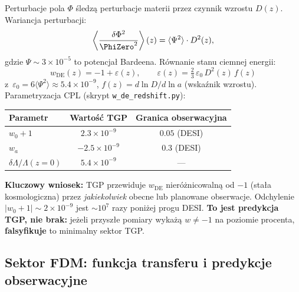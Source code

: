 \begin{remark}\label{rem:wz-quantitative}
Perturbacje pola $\Phi$ \'sledz\k{a} perturbacje materii
przez czynnik wzrostu $D(z)$. Wariancja perturbacji:
\begin{equation}\label{eq:delta-Phi-var}
  \left\langle\frac{\delta\Phi^2}{\PhiZero^2}\right\rangle(z)
  = \langle\Psi^2\rangle \cdot D^2(z),
\end{equation}
gdzie $\Psi \sim 3\times 10^{-5}$ to potencja\l{} Bardeena.
R\'ownanie stanu ciemnej energii:
\begin{equation}\label{eq:w-de-tgp}
  \boxed{
    w_{\mathrm{DE}}(z) = -1 + \varepsilon(z), \qquad
    \varepsilon(z) = \tfrac{2}{3}\,\varepsilon_0\,D^2(z)\,f(z)
  }
\end{equation}
z~$\varepsilon_0 = 6\langle\Psi^2\rangle \approx 5.4\times 10^{-9}$,
$f(z) = d\ln D/d\ln a$ (wska\'znik wzrostu).
Parametryzacja CPL (skrypt \texttt{w\_de\_redshift.py}):
\begin{center}
\begin{tabular}{lcc}
\toprule
  Parametr & Warto\'s\'c TGP & Granica obserwacyjna \\
\midrule
  $w_0 + 1$ & $2.3 \times 10^{-9}$ & $0.05$ (DESI) \\
  $w_a$ & $-2.5 \times 10^{-9}$ & $0.3$ (DESI) \\
  $\delta\Lambda/\Lambda(z{=}0)$ & $5.4 \times 10^{-9}$ & --- \\
\bottomrule
\end{tabular}
\end{center}
\textbf{Kluczowy wniosek:} TGP przewiduje $w_{\mathrm{DE}}$
nier\'o\.znicowaln\k{a} od $-1$ (sta\l{}a kosmologiczna) przez
\emph{jakiekolwiek} obecne lub planowane obserwacje.
Odchylenie $|w_0+1| \sim 2\times 10^{-9}$ jest $\sim 10^{7}$
razy poni\.zej progu DESI.
\textbf{To jest predykcja TGP, nie brak:} je\.zeli przysz\l{}e
pomiary wyka\.z\k{a} $w \neq -1$ na poziomie procenta,
\textbf{falsyfikuje} to minimalny sektor TGP.
\end{remark}

\subsection{Sektor FDM: funkcja transferu i predykcje obserwacyjne}
\label{ssec:fdm-transfer}

